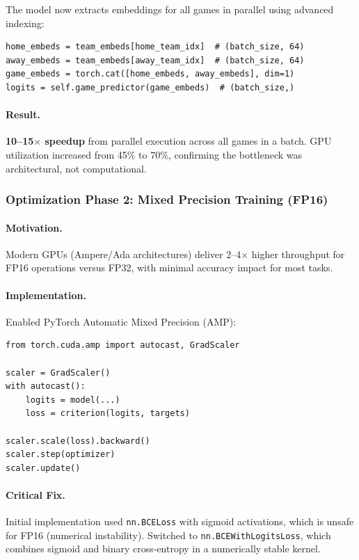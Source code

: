 The model now extracts embeddings for all games in parallel using advanced indexing:
\begin{verbatim}
home_embeds = team_embeds[home_team_idx]  # (batch_size, 64)
away_embeds = team_embeds[away_team_idx]  # (batch_size, 64)
game_embeds = torch.cat([home_embeds, away_embeds], dim=1)
logits = self.game_predictor(game_embeds)  # (batch_size,)
\end{verbatim}

\paragraph{Result.} \textbf{10--15$\times$ speedup} from parallel execution across all games in a batch. GPU utilization increased from 45\% to 70\%, confirming the bottleneck was architectural, not computational.

\subsubsection{Optimization Phase 2: Mixed Precision Training (FP16)}

\paragraph{Motivation.} Modern GPUs (Ampere/Ada architectures) deliver 2--4$\times$ higher throughput for FP16 operations versus FP32, with minimal accuracy impact for most tasks.

\paragraph{Implementation.} Enabled PyTorch Automatic Mixed Precision (AMP):
\begin{verbatim}
from torch.cuda.amp import autocast, GradScaler

scaler = GradScaler()
with autocast():
    logits = model(...)
    loss = criterion(logits, targets)

scaler.scale(loss).backward()
scaler.step(optimizer)
scaler.update()
\end{verbatim}

\paragraph{Critical Fix.} Initial implementation used \texttt{nn.BCELoss} with sigmoid activations, which is unsafe for FP16 (numerical instability). Switched to \texttt{nn.BCEWithLogitsLoss}, which combines sigmoid and binary cross-entropy in a numerically stable kernel.


